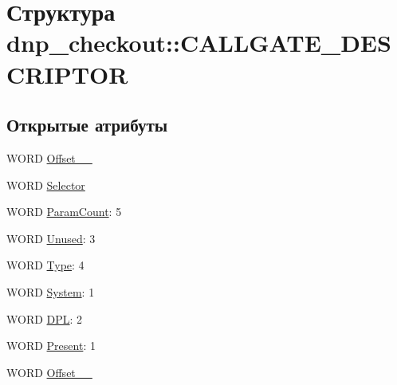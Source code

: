 \hypertarget{structdnp__checkout_1_1_c_a_l_l_g_a_t_e___d_e_s_c_r_i_p_t_o_r}{\section{Структура dnp\-\_\-checkout\-:\-:C\-A\-L\-L\-G\-A\-T\-E\-\_\-\-D\-E\-S\-C\-R\-I\-P\-T\-O\-R}
\label{structdnp__checkout_1_1_c_a_l_l_g_a_t_e___d_e_s_c_r_i_p_t_o_r}
}
\subsection*{Открытые атрибуты}
\begin{DoxyCompactItemize}
\item 
W\-O\-R\-D \hyperlink{structdnp__checkout_1_1_c_a_l_l_g_a_t_e___d_e_s_c_r_i_p_t_o_r_a16553fe2bf118ead1e8c3010136a4304}{Offset\-\_\-\_}
\item 
W\-O\-R\-D \hyperlink{structdnp__checkout_1_1_c_a_l_l_g_a_t_e___d_e_s_c_r_i_p_t_o_r_ae619781e27c8a07bd1509b2df201be42}{Selector}
\item 
W\-O\-R\-D \hyperlink{structdnp__checkout_1_1_c_a_l_l_g_a_t_e___d_e_s_c_r_i_p_t_o_r_a3b8a86319111d57e27d03a3ff267ea8b}{Param\-Count}\-: 5
\item 
W\-O\-R\-D \hyperlink{structdnp__checkout_1_1_c_a_l_l_g_a_t_e___d_e_s_c_r_i_p_t_o_r_ac309a7299b11ca4d74956f2ed7b9cec1}{Unused}\-: 3
\item 
W\-O\-R\-D \hyperlink{structdnp__checkout_1_1_c_a_l_l_g_a_t_e___d_e_s_c_r_i_p_t_o_r_ab1864a24053c64c18ca11ff76590632a}{Type}\-: 4
\item 
W\-O\-R\-D \hyperlink{structdnp__checkout_1_1_c_a_l_l_g_a_t_e___d_e_s_c_r_i_p_t_o_r_af808fb075258cd4981fb61db9cbe7f73}{System}\-: 1
\item 
W\-O\-R\-D \hyperlink{structdnp__checkout_1_1_c_a_l_l_g_a_t_e___d_e_s_c_r_i_p_t_o_r_acb96a2a87acc898e4566a1eff83ca8f4}{D\-P\-L}\-: 2
\item 
W\-O\-R\-D \hyperlink{structdnp__checkout_1_1_c_a_l_l_g_a_t_e___d_e_s_c_r_i_p_t_o_r_aeb0fcded4f9eac8adacca728b963bf2f}{Present}\-: 1
\item 
W\-O\-R\-D \hyperlink{structdnp__checkout_1_1_c_a_l_l_g_a_t_e___d_e_s_c_r_i_p_t_o_r_a5ca902acc1370183732e7de86718cf5f}{Offset\-\_\-\_}
\end{DoxyCompactItemize}


